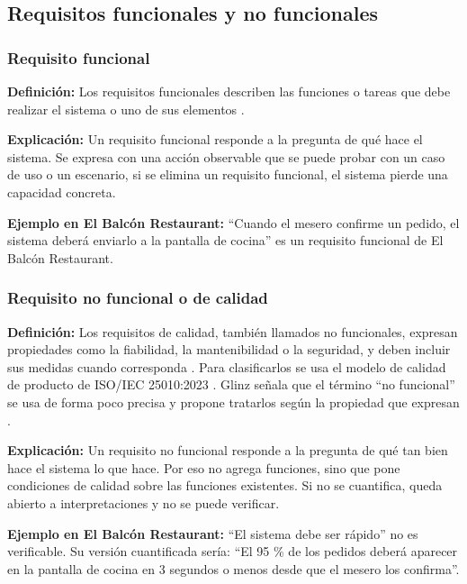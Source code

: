 \subsection{Requisitos funcionales y no funcionales}
\subsubsection{Requisito funcional}

\textbf{Definición:} Los requisitos funcionales describen las funciones o tareas que debe realizar el sistema o uno de sus elementos \cite[\nopp cl.~5.2.8.3]{ieee29148}.

\textbf{Explicación:} Un requisito funcional responde a la pregunta de qué hace el sistema. Se expresa con una acción observable que se puede probar con un caso de uso o un escenario, si se elimina un requisito funcional, el sistema pierde una capacidad concreta.

\textbf{Ejemplo en El Balcón Restaurant:} “Cuando el mesero confirme un pedido, el sistema deberá enviarlo a la pantalla de cocina” es un requisito funcional de El Balcón Restaurant.

\subsubsection{Requisito no funcional o de calidad}

\textbf{Definición:} Los requisitos de calidad, también llamados no funcionales, expresan propiedades como la fiabilidad, la mantenibilidad o la seguridad, y deben incluir sus medidas cuando corresponda \cite[\nopp cl.~5.2.8.3]{ieee29148}. Para clasificarlos se usa el modelo de calidad de producto de ISO/IEC 25010:2023 \cite{iso25010}. Glinz señala que el término “no funcional” se usa de forma poco precisa y propone tratarlos según la propiedad que expresan \cite{glinz2007}.

\textbf{Explicación:} Un requisito no funcional responde a la pregunta de qué tan bien hace el sistema lo que hace. Por eso no agrega funciones, sino que pone condiciones de calidad sobre las funciones existentes. Si no se cuantifica, queda abierto a interpretaciones y no se puede verificar.

\textbf{Ejemplo en El Balcón Restaurant:} “El sistema debe ser rápido” no es verificable. Su versión cuantificada sería: “El 95 \% de los pedidos deberá aparecer en la pantalla de cocina en 3 segundos o menos desde que el mesero los confirma”.

